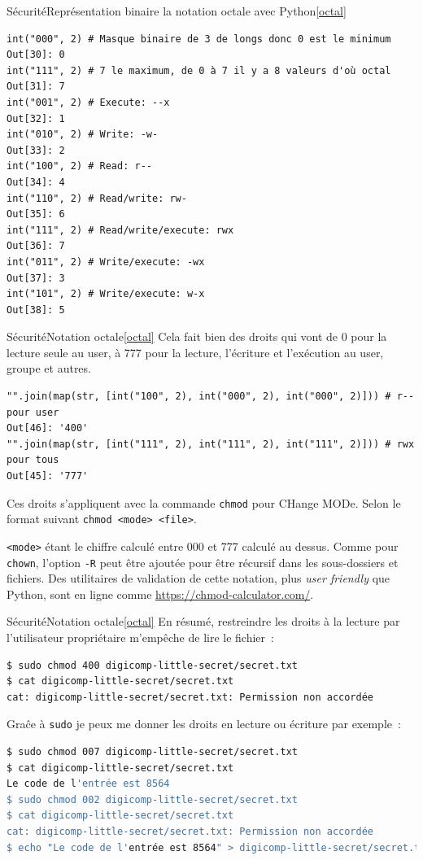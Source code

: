 \documentclass{beamer}
\begin{document}
    \begin{frame}[fragile]{Sécurité}{Représentation binaire la notation octale avec Python\cref{octal}}
        \begin{lstlisting}
int("000", 2) # Masque binaire de 3 de longs donc 0 est le minimum
Out[30]: 0
int("111", 2) # 7 le maximum, de 0 à 7 il y a 8 valeurs d'où octal
Out[31]: 7
int("001", 2) # Execute: --x
Out[32]: 1
int("010", 2) # Write: -w-
Out[33]: 2
int("100", 2) # Read: r--
Out[34]: 4
int("110", 2) # Read/write: rw-
Out[35]: 6
int("111", 2) # Read/write/execute: rwx
Out[36]: 7
int("011", 2) # Write/execute: -wx
Out[37]: 3
int("101", 2) # Write/execute: w-x
Out[38]: 5
        \end{lstlisting}
    \end{frame}

    \begin{frame}[fragile]{Sécurité}{Notation octale\cref{octal}}
        Cela fait bien des droits qui vont de 0 pour la lecture seule au user, à 777 pour la lecture, l'écriture et l'exécution au user, groupe et autres.
        \begin{lstlisting}
"".join(map(str, [int("100", 2), int("000", 2), int("000", 2)])) # r-- pour user
Out[46]: '400'
"".join(map(str, [int("111", 2), int("111", 2), int("111", 2)])) # rwx pour tous
Out[45]: '777'
        \end{lstlisting}
        Ces droits s'appliquent avec la commande \lstinline{chmod} pour CHange MODe.
        Selon le format suivant \lstinline{chmod <mode> <file>}.

        \lstinline{<mode>} étant le chiffre calculé entre 000 et 777 calculé au dessus.
        Comme pour \lstinline{chown}, l'option \lstinline{-R} peut être ajoutée pour être récursif dans les sous-dossiers et fichiers.
        \bigbreak
        Des utilitaires de validation de cette notation, plus \textit{user friendly} que Python, sont en ligne comme \url{https://chmod-calculator.com/}.
    \end{frame}

    \begin{frame}[fragile]{Sécurité}{Notation octale\cref{octal}}
        En résumé, restreindre les droits à la lecture par l'utilisateur propriétaire m'empêche de lire le fichier~:
        \begin{lstlisting}[language=bash]
$ sudo chmod 400 digicomp-little-secret/secret.txt
$ cat digicomp-little-secret/secret.txt
cat: digicomp-little-secret/secret.txt: Permission non accordée
        \end{lstlisting}
        Graĉe à \lstinline{sudo} je peux me donner les droits en lecture ou écriture par exemple~:
        \begin{lstlisting}[language=bash]
$ sudo chmod 007 digicomp-little-secret/secret.txt
$ cat digicomp-little-secret/secret.txt
Le code de l'entrée est 8564
$ sudo chmod 002 digicomp-little-secret/secret.txt
$ cat digicomp-little-secret/secret.txt
cat: digicomp-little-secret/secret.txt: Permission non accordée
$ echo "Le code de l'entrée est 8564" > digicomp-little-secret/secret.txt
        \end{lstlisting}
    \end{frame}
\end{document}
